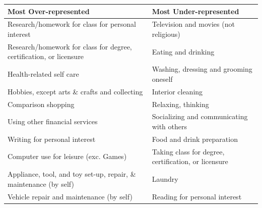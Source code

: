\begin{tabularx}{\textwidth}{@{} L L @{}}
\toprule
\textmd{Most Over-represented} & 
\textmd{Most Under-represented} \\
\midrule
Research/homework for class for personal interest & 
Television and movies (not religious) \\[0.6em]

Research/homework for class for degree, certification, or licensure & 
Eating and drinking \\[0.6em]

Health-related self care & 
Washing, dressing and grooming oneself \\[0.6em]

Hobbies, except arts \& crafts and collecting & 
Interior cleaning \\[0.6em]

Comparison shopping & 
Relaxing, thinking \\[0.6em]

Using other financial services & 
Socializing and communicating with others \\[0.6em]

Writing for personal interest & 
Food and drink preparation \\[0.6em]

Computer use for leisure (exc. Games) & 
Taking class for degree, certification, or licensure \\[0.6em]

Appliance, tool, and toy set-up, repair, \& maintenance (by self) & 
Laundry \\[0.6em]

Vehicle repair and maintenance (by self) & 
Reading for personal interest \\
\bottomrule
\end{tabularx}